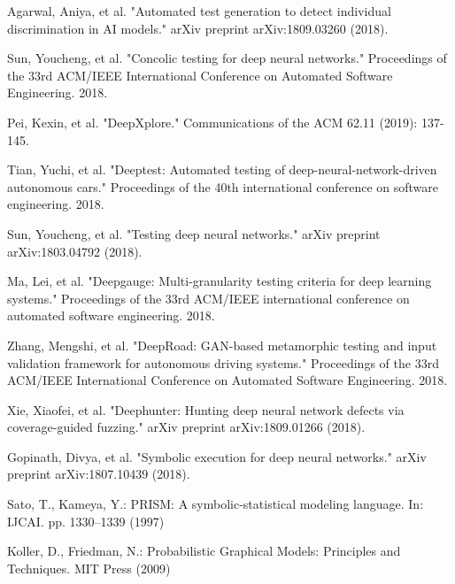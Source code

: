 \begin{singlespace}
\begin{thebibliography}{}
    






 Agarwal, Aniya, et al. "Automated test generation to detect individual discrimination in AI models." arXiv preprint arXiv:1809.03260 (2018).

 Sun, Youcheng, et al. "Concolic testing for deep neural networks." Proceedings of the 33rd ACM/IEEE International Conference on Automated Software Engineering. 2018.

 Pei, Kexin, et al. "DeepXplore." Communications of the ACM 62.11 (2019): 137-145.

 Tian, Yuchi, et al. "Deeptest: Automated testing of deep-neural-network-driven autonomous cars." Proceedings of the 40th international conference on software engineering. 2018.

 Sun, Youcheng, et al. "Testing deep neural networks." arXiv preprint arXiv:1803.04792 (2018).

 Ma, Lei, et al. "Deepgauge: Multi-granularity testing criteria for deep learning systems." Proceedings of the 33rd ACM/IEEE international conference on automated software engineering. 2018.

 Zhang, Mengshi, et al. "DeepRoad: GAN-based metamorphic testing and input validation framework for autonomous driving systems." Proceedings of the 33rd ACM/IEEE International Conference on Automated Software Engineering. 2018.

 Xie, Xiaofei, et al. "Deephunter: Hunting deep neural network defects via coverage-guided fuzzing." arXiv preprint arXiv:1809.01266 (2018).

	Gopinath, Divya, et al. "Symbolic execution for deep neural networks." arXiv preprint arXiv:1807.10439 (2018).


 Sato, T., Kameya, Y.: PRISM: A symbolic-statistical modeling language. In: IJCAI. pp. 1330--1339 (1997)

 Koller, D., Friedman, N.: Probabilistic Graphical Models: Principles and Techniques. MIT Press (2009)


\end{thebibliography}
\end{singlespace}
